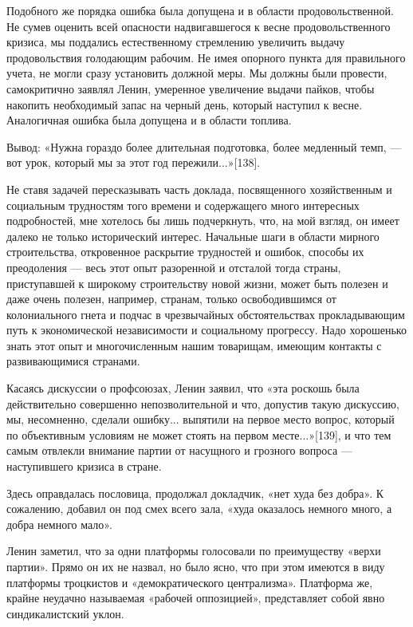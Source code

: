 \documentclass[12pt, a4paper, openany]{book}
\begin{document}
Подобного же порядка ошибка была допущена и в области продовольственной. Не сумев оценить всей опасности надвигавшегося к весне продовольственного кризиса, мы поддались естественному стремлению увеличить выдачу продовольствия голодающим рабочим. Не имея опорного пункта для правильного учета, не могли сразу установить должной меры. Мы должны были провести, самокритично заявлял Ленин, умеренное увеличение выдачи пайков, чтобы накопить необходимый запас на черный день, который наступил к весне. Аналогичная ошибка была допущена и в области топлива.

Вывод: «Нужна гораздо более длительная подготовка, более медленный темп, — вот урок, который мы за этот год пережили...»[138].

Не ставя задачей пересказывать часть доклада, посвященного хозяйственным и социальным трудностям того времени и содержащего много интересных подробностей, мне хотелось бы лишь подчеркнуть, что, на мой взгляд, он имеет далеко не только исторический интерес. Начальные шаги в области мирного строительства, откровенное раскрытие трудностей и ошибок, способы их преодоления — весь этот опыт разоренной и отсталой тогда страны, приступавшей к широкому строительству новой жизни, может быть полезен и даже очень полезен, например, странам, только освободившимся от колониального гнета и подчас в чрезвычайных обстоятельствах прокладывающим путь к экономической независимости и социальному прогрессу. Надо хорошенько знать этот опыт и многочисленным нашим товарищам, имеющим контакты с развивающимися странами.

Касаясь дискуссии о профсоюзах, Ленин заявил, что «эта роскошь была действительно совершенно непозволительной и что, допустив такую дискуссию, мы, несомненно, сделали ошибку... выпятили на первое место вопрос, который по объективным условиям не может стоять на первом месте...»[139], и что тем самым отвлекли внимание партии от насущного и грозного вопроса — наступившего кризиса в стране.

Здесь оправдалась пословица, продолжал докладчик, «нет худа без добра». К сожалению, добавил он под смех всего зала, «худа оказалось немного много, а добра немного мало».

Ленин заметил, что за одни платформы голосовали по преимуществу «верхи партии». Прямо он их не назвал, но было ясно, что при этом имеются в виду платформы троцкистов и «демократического централизма». Платформа же, крайне неудачно называемая «рабочей оппозицией», представляет собой явно синдикалистский уклон.
\end{document}
